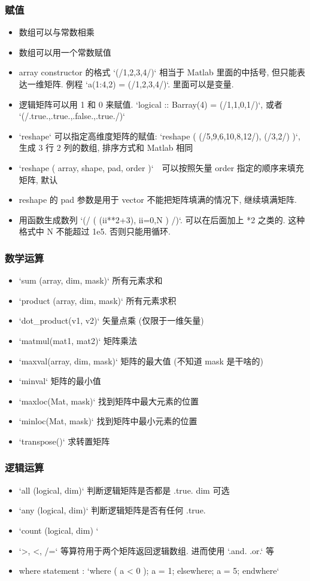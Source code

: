 \subsubsection{赋值}
\begin{itemize}
\item 数组可以与常数相乘
\item 数组可以用一个常数赋值
\item array constructor 的格式 `(/1,2,3,4/)` 相当于 Matlab 里面的中括号, 但只能表达一维矩阵. 例程 `a(1:4,2) = (/1,2,3,4/)`. 里面可以是变量.
\item 逻辑矩阵可以用 1 和 0 来赋值. `logical :: Barray(4) = (/1,1,0,1/)`, 
   或者 `(/.true.,.true.,.false.,.true./)`
\item `reshape` 可以指定高维度矩阵的赋值: 
   `reshape ( (/5,9,6,10,8,12/), (/3,2/) )`, 生成 3 行 2 列的数组, 排序方式和 Matlab 相同
\item `reshape (  array, shape, pad, order )`　可以按照矢量 order 指定的顺序来填充矩阵, 默认
\item reshape 的 pad 参数是用于 vector 不能把矩阵填满的情况下, 继续填满矩阵.
\item 用函数生成数列  `(/ ( (ii**2+3), ii=0,N ) /)`.  可以在后面加上 *2 之类的. 这种格式中 N 不能超过 1e5. 否则只能用循环.
\end{itemize}

\subsubsection{数学运算}
\begin{itemize}
\item `sum (array, dim, mask)` 所有元素求和
\item `product (array, dim, mask)` 所有元素求积
\item `dot_product(v1, v2)` 矢量点乘 (仅限于一维矢量)
\item `matmul(mat1, mat2)` 矩阵乘法
\item `maxval(array, dim, mask)` 矩阵的最大值 (不知道 mask 是干啥的)
\item `minval` 矩阵的最小值
\item `maxloc(Mat, mask)` 找到矩阵中最大元素的位置
\item `minloc(Mat, mask)` 找到矩阵中最小元素的位置
\item `transpose()` 求转置矩阵
\end{itemize}

\subsubsection{逻辑运算}
\begin{itemize}
\item `all (logical, dim)` 判断逻辑矩阵是否都是 .true.  dim 可选
\item `any (logical, dim)` 判断逻辑矩阵是否有任何 .true.
\item `count (logical, dim) `
\item `>, <, /=` 等算符用于两个矩阵返回逻辑数组. 进而使用 `.and. .or.` 等
\item where statement : 
`where ( a < 0 ); a = 1; elsewhere; a = 5; endwhere`
\end{itemize}

